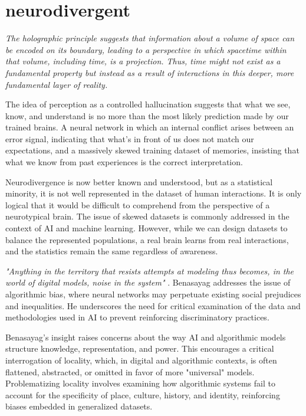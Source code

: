 \chapter*{neurodivergent}
\begin{center}
\vspace{2cm}
\begin{flushright}
\large
\textit{The holographic principle suggests that information about a volume of space can be encoded on its boundary, leading to a perspective in which spacetime within that volume, including time, is a projection. Thus, time might not exist as a fundamental property but instead as a result of interactions in this deeper, more fundamental layer of reality.}
\end{flushright}
\vspace{2cm}
\end{center}
\normalsize

\newpage 
The idea of perception as a controlled hallucination suggests that what we see, know, and understand is no more than the most likely prediction made by our trained brains. A neural network in which an internal conflict arises between an error signal, indicating that what's in front of us does not match our expectations, and a massively skewed training dataset of memories, insisting that what we know from past experiences is the correct interpretation.

Neurodivergence is now better known and understood, but as a statistical minority, it is not well represented in the dataset of human interactions. It is only logical that it would be difficult to comprehend from the perspective of a neurotypical brain. The issue of skewed datasets is commonly addressed in the context of AI and machine learning. However, while we can design datasets to balance the represented populations, a real brain learns from real interactions, and the statistics remain the same regardless of awareness.

\textit{"Anything in the territory that resists attempts at modeling thus becomes, in the world of digital models, noise in the system"} \citep{benasayag2019}. Benasayag addresses the issue of algorithmic bias, where neural networks may perpetuate existing social prejudices and inequalities. He underscores the need for critical examination of the data and methodologies used in AI to prevent reinforcing discriminatory practices.

Benasayag's insight raises concerns about the way AI and algorithmic models structure knowledge, representation, and power. This encourages a critical interrogation of locality, which, in digital and algorithmic contexts, is often flattened, abstracted, or omitted in favor of more "universal" models. Problematizing locality involves examining how algorithmic systems fail to account for the specificity of place, culture, history, and identity, reinforcing biases embedded in generalized datasets.

